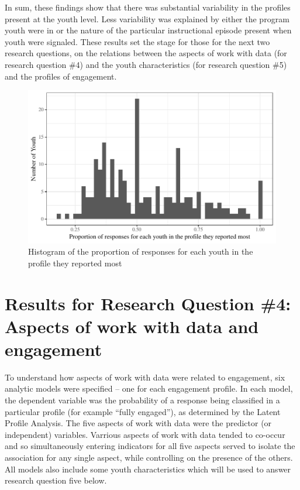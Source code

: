 \documentclass[]{msu-thesis}
\theoremstyle{definition}
\theoremstyle{definition}
\theoremstyle{definition}
\theoremstyle{remark}
\begin{document}
In sum, these findings show that there was substantial variability in
the profiles present at the youth level. Less variability was explained
by either the program youth were in or the nature of the particular
instructional episode present when youth were signaled. These results
set the stage for those for the next two research questions, on the
relations between the aspects of work with data (for research question
\#4) and the youth characteristics (for research question \#5) and the
profiles of engagement.

\begin{figure}

{\centering \includegraphics[width=0.8\linewidth]{rosenberg-dissertation_files/figure-latex/unnamed-chunk-16-1}

}

\caption{Histogram of the proportion of responses for each youth in the profile they reported most}\label{fig:unnamed-chunk-16}
\end{figure}

\section{Results for Research Question \#4: Aspects of work with data
and
engagement}\label{results-for-research-question-4-aspects-of-work-with-data-and-engagement}

To understand how aspects of work with data were related to engagement,
six analytic models were specified -- one for each engagement profile.
In each model, the dependent variable was the probability of a response
being classified in a particular profile (for example ``fully
engaged''), as determined by the Latent Profile Analysis. The five
aspects of work with data were the predictor (or independent) variables.
Varrious aspects of work with data tended to co-occur and so
simultaneously entering indicators for all five aspects served to
isolate the association for any single aspect, while controlling on the
presence of the others. All models also include some youth
characteristics which will be used to answer research question five
below.
\end{document}

